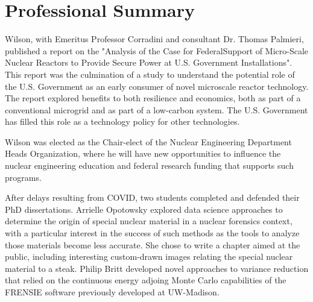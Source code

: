 \section{Professional Summary}

Wilson, with Emeritus Professor Corradini and consultant Dr. Thomas Palmieri,
published a report on the "Analysis of the Case for FederalSupport of
Micro-Scale Nuclear Reactors to Provide Secure Power at U.S. Government
Installations".  This report was the culmination of a study to understand the
potential role of the U.S. Government as an early consumer of novel microscale
reactor technology. The report explored benefits to both resilience and
economics, both as part of a conventional microgrid and as part of a low-carbon
system. The U.S. Government has filled this role as a technology policy for
other technologies.

Wilson was elected as the Chair-elect of the Nuclear Engineering Department
Heads Organization, where he will have new opportunities to influence the
nuclear engineering education and federal research funding that supports such 
programs.

After delays resulting from COVID, two students completed and defended their PhD
dissertations.  Arrielle Opotowsky explored data science approaches to determine
the origin of special nuclear material in a nuclear forensics context, with a
particular interest in the success of such methods as the tools to analyze those
materials become less accurate.  She chose to write a chapter aimed at the
public, including interesting custom-drawn images relating the special nuclear
material to a steak. Philip Britt developed novel approaches to variance
reduction that relied on the continuous energy adjoing Monte Carlo capabilities
of the FRENSIE software previously developed at UW-Madison.